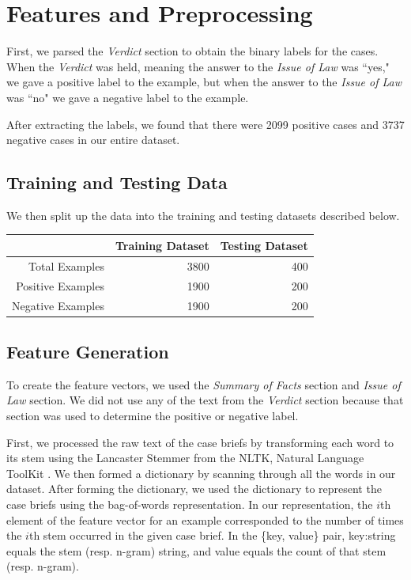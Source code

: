\documentclass[journal]{IEEEtran}
\begin{document}
\section{Features and Preprocessing}

First, we parsed the \textit{Verdict} section to obtain the binary labels for the cases. When the \textit{Verdict} was held, meaning the answer to the \textit{Issue of Law} was ``yes," we gave a positive label to the example, but when the answer to the \textit{Issue of Law} was ``no" we gave a negative label to the example. 

After extracting the labels, we found that there were 2099 positive cases and 3737 negative cases in our entire dataset.

\subsection{Training and Testing Data}

We then split up the data into the training and testing datasets described below.

\begin{table}[ht]
\centering
\begin{tabular}{rrr}
  \hline
& Training Dataset &	Testing Dataset\\
  \hline
Total Examples&	3800&	400 \\
Positive Examples &	1900 &	200 \\
Negative Examples &	1900 &	200 \\
   \hline
\end{tabular}
\end{table}

\subsection{Feature Generation}

To create the feature vectors, we used the \textit{Summary of Facts} section and \textit{Issue of Law} section. We did not use any of the text from the \textit{Verdict} section because that section was used to determine the positive or negative label.

First, we processed the raw text of the case briefs by transforming each word to its stem using the Lancaster Stemmer from the NLTK, Natural Language ToolKit \cite{Loper:2002:NNL:1118108.1118117}. We then formed a dictionary by scanning through all the words in our dataset. After forming the dictionary, we used the dictionary to represent the case briefs using the bag-of-words representation. In our representation, the $i$th element of the feature vector for an example corresponded to the number of times the $i$th stem occurred in the given case brief. In the \{key, value\} pair, key:string equals the stem (resp. n-gram) string, and value equals the count of that stem (resp. n-gram).
\end{document}
